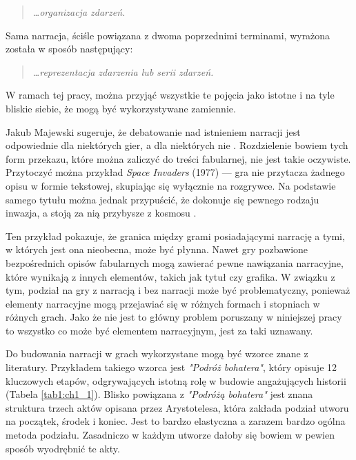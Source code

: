 \begin{quotation}
	\ldots \textit{organizacja zdarzeń.} \cite{narrative_structures}
\end{quotation}

Sama narracja, ściśle powiązana z dwoma poprzednimi terminami, wyrażona została w sposób
następujący:

\begin{quotation}
	\ldots \textit{reprezentacja zdarzenia lub serii zdarzeń.} \cite{narrative_structures}
\end{quotation}

W ramach tej pracy, można przyjąć wszystkie te pojęcia jako istotne i na tyle bliskie
siebie, że mogą być wykorzystywane zamiennie.

Jakub Majewski sugeruje, że debatowanie nad istnieniem narracji jest odpowiednie dla niektórych
gier, a dla niektórych nie \cite{theorising_narrative}. Rozdzielenie bowiem tych form
przekazu, które można zaliczyć do treści fabularnej, nie jest takie oczywiste. Przytoczyć można
przykład \textit{Space Invaders} (1977) --- gra nie przytacza żadnego opisu w formie tekstowej,
skupiając się wyłącznie na rozgrywce. Na podstawie samego tytułu można jednak
przypuścić, że dokonuje się pewnego rodzaju inwazja, a stoją za nią przybysze z kosmosu \cite{theorising_narrative}.

Ten przykład pokazuje, że granica między grami posiadającymi narrację a tymi, w których jest ona nieobecna,
może być płynna. Nawet gry pozbawione bezpośrednich opisów fabularnych mogą zawierać pewne nawiązania narracyjne,
które wynikają z innych elementów, takich jak tytuł czy grafika. W związku z tym, podział na gry z narracją i bez
narracji może być problematyczny, ponieważ elementy narracyjne mogą przejawiać się w różnych formach i stopniach
w różnych grach. Jako że nie jest to główny problem poruszany w niniejszej pracy to wszystko co może być elementem
narracyjnym, jest za taki uznawany.

Do budowania narracji w grach wykorzystane mogą być wzorce znane z literatury. Przykładem takiego wzorca jest
\textit{"Podróż bohatera"}\cite{narrative_structures}, który opisuje 12 kluczowych etapów, odgrywających
istotną rolę w budowie angażujących historii (Tabela \ref{tab1:ch1_1}). Blisko powiązana z \textit{"Podróżą bohatera"}
jest znana struktura trzech aktów opisana przez Arystotelesa, która zakłada podział utworu na
początek, środek i koniec\cite{narrative_structures}. Jest to bardzo elastyczna a zarazem bardzo ogólna metoda
podziału. Zasadniczo w każdym utworze dałoby się bowiem w pewien sposób wyodrębnić te akty.

